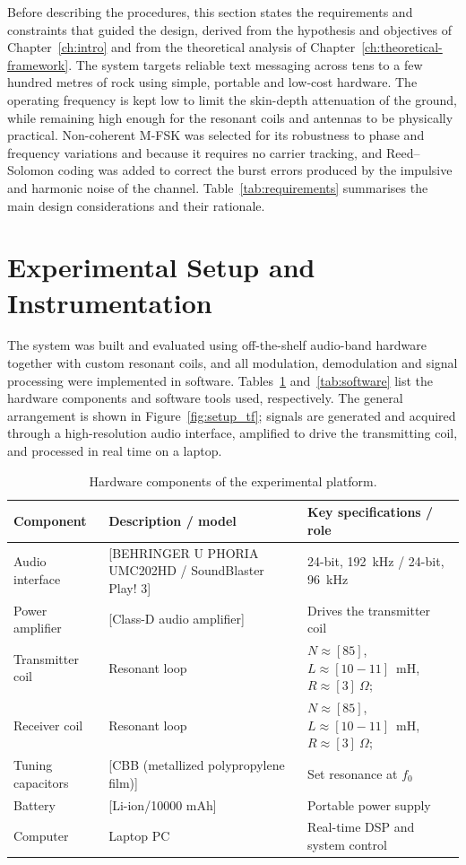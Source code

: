 Before describing the procedures, this section states the requirements and
constraints that guided the design, derived from the hypothesis and objectives of
Chapter~\ref{ch:intro} and from the theoretical analysis of
Chapter~\ref{ch:theoretical-framework}. The system targets reliable text messaging across tens
to a few hundred metres of rock using simple, portable and low-cost hardware. The
operating frequency is kept low to limit the skin-depth attenuation of the ground,
while remaining high enough for the resonant coils and antennas to be physically
practical. Non-coherent M-FSK was selected for its robustness to phase and
frequency variations and because it requires no carrier tracking, and
Reed--Solomon coding was added to correct the burst errors produced by the
impulsive and harmonic noise of the channel. Table~\ref{tab:requirements}
summarises the main design considerations and their rationale.



\section{Experimental Setup and Instrumentation}
\label{sec:setup}

The system was built and evaluated using off-the-shelf audio-band hardware
together with custom resonant coils, and all modulation, demodulation and signal
processing were implemented in software. Tables~\ref{tab:hardware}
and~\ref{tab:software} list the hardware components and software tools used,
respectively. The general arrangement is shown in Figure~\ref{fig:setup_tf};
signals are generated and acquired through a high-resolution audio interface,
amplified to drive the transmitting coil, and processed in real time on a
laptop.

\begin{table}[H]
  \centering
  \caption{Hardware components of the experimental platform.}
  \label{tab:hardware}
  \begin{tabular}{p{} p{} p{}}
    \toprule
    \textbf{Component} & \textbf{Description / model} & \textbf{Key specifications / role} \\
    \midrule
    Audio interface & [BEHRINGER U PHORIA UMC202HD / SoundBlaster Play! 3] & 24-bit, 192~kHz / 24-bit, 96~kHz\\
    Power amplifier & [Class-D audio amplifier] & Drives the transmitter coil \\
    Transmitter coil & Resonant loop & $N \approx [85]$, $L \approx [10-11]$~mH,
      $R \approx [3]\ \Omega$; \\
    Receiver coil & Resonant loop & $N \approx [85]$, $L \approx [10-11]$~mH,
      $R \approx [3]\ \Omega$; \\
    Tuning capacitors & [CBB (metallized polypropylene film)] & Set resonance at $f_0$ \\
    Battery & [Li-ion/10000 mAh] & Portable power supply \\
    Computer & Laptop PC & Real-time DSP and system control \\
    \bottomrule
  \end{tabular}
\end{table}

